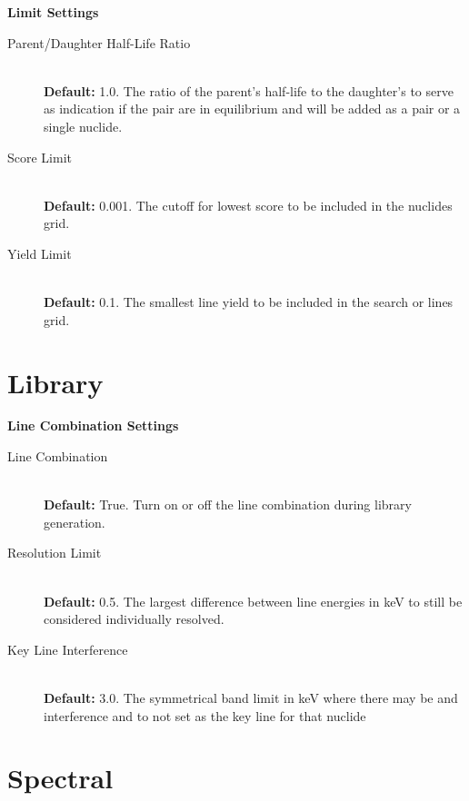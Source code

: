 \documentclass[12pt,report,justified]{SANDreport}
\begin{document}
\begin{center}
{\large \textbf{Limit Settings}}
\end{center}
\begin{description}
\item[Parent/Daughter Half-Life Ratio] \label{itm:pd_hl_ratio} \hfill \\
\textbf{Default:} 1.0. The ratio of the parent’s half-life to the daughter’s to serve as indication if the
pair are in equilibrium and will be added as a pair or a single nuclide.
\item[Score Limit] \label{itm:score_lim} \hfill \\
\textbf{Default:} 0.001. The cutoff for lowest score to be included in the nuclides grid.
\item[Yield Limit] \label{itm:yld_lim} \hfill \\
 \textbf{Default:} 0.1. The smallest line yield to be included in the search or lines grid.
\end{description}


      \section{Library}

\begin{center}
{\large \textbf{Line Combination Settings}}
\end{center}
\begin{description}
\item[Line Combination] \label{itm:ln_combo} \hfill \\
\textbf{Default:} True. Turn on or off the line combination during library generation.
\item[Resolution Limit] \label{itm:res_lim} \hfill \\
\textbf{Default:} 0.5. The largest difference between line energies in keV to still be considered
individually resolved.
\item[Key Line Interference] \label{itm:ky_inf} \hfill \\
 \textbf{Default:} 3.0. The symmetrical band limit in keV where there may be and interference and to 
not set as the key line for that nuclide
\end{description}
      \section{Spectral}
\end{document}
